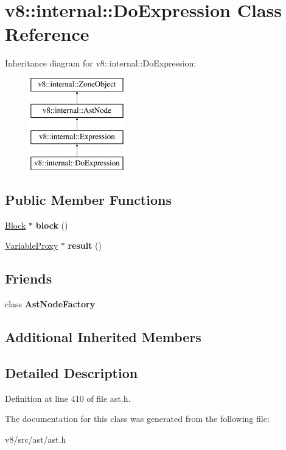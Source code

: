 \hypertarget{classv8_1_1internal_1_1DoExpression}{}\section{v8\+:\+:internal\+:\+:Do\+Expression Class Reference}
\label{classv8_1_1internal_1_1DoExpression}
Inheritance diagram for v8\+:\+:internal\+:\+:Do\+Expression\+:\begin{figure}[H]
\begin{center}
\leavevmode
\includegraphics[height=4.000000cm]{classv8_1_1internal_1_1DoExpression}
\end{center}
\end{figure}
\subsection*{Public Member Functions}
\begin{DoxyCompactItemize}
\item 
\mbox{\label{classv8_1_1internal_1_1DoExpression_ac94604601ec2f5d80a086d698d5d9b28}} 
\mbox{\hyperlink{classv8_1_1internal_1_1Block}{Block}} $\ast$ {\bfseries block} ()
\item 
\mbox{\label{classv8_1_1internal_1_1DoExpression_aad28729b08f77bd0fd60ef2ea8022d57}} 
\mbox{\hyperlink{classv8_1_1internal_1_1VariableProxy}{Variable\+Proxy}} $\ast$ {\bfseries result} ()
\end{DoxyCompactItemize}
\subsection*{Friends}
\begin{DoxyCompactItemize}
\item 
\mbox{\label{classv8_1_1internal_1_1DoExpression_a8d587c8ad3515ff6433eb83c578e795f}} 
class {\bfseries Ast\+Node\+Factory}
\end{DoxyCompactItemize}
\subsection*{Additional Inherited Members}


\subsection{Detailed Description}


Definition at line 410 of file ast.\+h.



The documentation for this class was generated from the following file\+:\begin{DoxyCompactItemize}
\item 
v8/src/ast/ast.\+h\end{DoxyCompactItemize}
